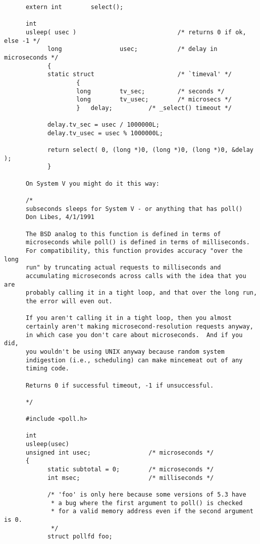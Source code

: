 \documentclass{article}
\begin{document}
\begin{CJK*}{Bg5}{ming}
\begin{verbatim}
      extern int        select();

      int
      usleep( usec )                            /* returns 0 if ok, else -1 */
       	    long                usec;           /* delay in microseconds */
            {
       	    static struct                       /* `timeval' */
               	    {
                    long        tv_sec;         /* seconds */
       	            long        tv_usec;        /* microsecs */
               	    }   delay;          /* _select() timeout */

            delay.tv_sec = usec / 1000000L;
       	    delay.tv_usec = usec % 1000000L;

            return select( 0, (long *)0, (long *)0, (long *)0, &delay );
       	    }

      On System V you might do it this way:

      /*
      subseconds sleeps for System V - or anything that has poll()
      Don Libes, 4/1/1991

      The BSD analog to this function is defined in terms of
      microseconds while poll() is defined in terms of milliseconds.
      For compatibility, this function provides accuracy "over the long
      run" by truncating actual requests to milliseconds and
      accumulating microseconds across calls with the idea that you are
      probably calling it in a tight loop, and that over the long run,
      the error will even out.

      If you aren't calling it in a tight loop, then you almost
      certainly aren't making microsecond-resolution requests anyway,
      in which case you don't care about microseconds.  And if you did,
      you wouldn't be using UNIX anyway because random system
      indigestion (i.e., scheduling) can make mincemeat out of any
      timing code.

      Returns 0 if successful timeout, -1 if unsuccessful.

      */

      #include <poll.h>

      int
      usleep(usec)
      unsigned int usec;                /* microseconds */
      {
            static subtotal = 0;        /* microseconds */
            int msec;                   /* milliseconds */

            /* 'foo' is only here because some versions of 5.3 have
             * a bug where the first argument to poll() is checked
             * for a valid memory address even if the second argument is 0.
             */
            struct pollfd foo;


\end{verbatim}
\end{CJK*}
\end{document}
